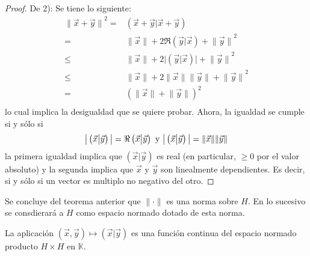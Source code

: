 \documentclass[12pt]{report}
\theoremstyle{largebreak}
\newcommand\abs[1]{\ensuremath{\big|#1\big|}}
\newcommand\norm[1]{\ensuremath{\|#1\|}}
\newcommand\pint[2]{\ensuremath{\left(#1\big| #2\right)}}
\begin{document}
\begin{proof}
        De 2): Se tiene lo siguiente:
        \begin{equation*}
            \begin{split}
                \norm{\vec{x}+\vec{y}}^2=&\pint{\vec{x}+\vec{y}}{\vec{x}+\vec{y}}\\
                =&\norm{\vec{x}}+2\Re\pint{\vec{y}}{\vec{x}}+\norm{\vec{y}}^2\\
                \leq&\norm{\vec{x}}+2\abs{\pint{\vec{y}}{\vec{x}}}+\norm{\vec{y}}^2\\
                \leq &\norm{\vec{x}}+2\norm{\vec{x}}\norm{\vec{y}}+\norm{\vec{y}}^2\\
                =& (\norm{\vec{x}}+\norm{\vec{y}})^2\\
            \end{split}
        \end{equation*}
        lo cual implica la desigualdad que se quiere probar. Ahora, la igualdad se cumple si y sólo si
        \begin{equation*}
            \abs{\pint{\vec{x}}{\vec{y}}}=\Re\pint{\vec{x}}{\vec{y}}\textup{ y }\abs{\pint{\vec{x}}{\vec{y}}}=\norm{\vec{x}}\norm{\vec{y}}
        \end{equation*}
        la primera igualdad implica que $\pint{\vec{x}}{\vec{y}}$ es real (en particular, $\geq0$ por el valor absoluto) y la segunda implica que $\vec{x}$ y $\vec{y}$ son linealmente dependientes. Es decir, si y sólo si un vector es multiplo no negativo del otro.
    \end{proof}

    Se concluye del teorema anterior que $\norm{\cdot}$ es una norma sobre $H$. En lo sucesivo se consdierará a $H$ como espacio normado dotado de esta norma.

    \begin{propo}
        La aplicación $(\vec{x},\vec{y})\mapsto\pint{\vec{x}}{\vec{y}}$
        es una función continua del espacio normado producto $H\times H$ en $\mathbb{K}$.
    \end{propo}
\end{document}
